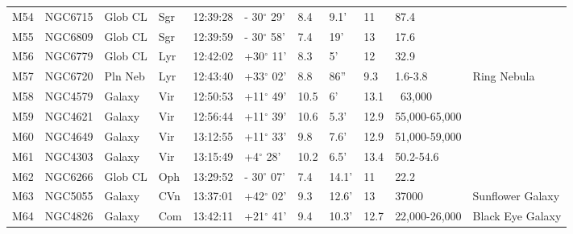\documentclass[10pt,twoside,a4paper,english]{article}
\begin{document}
\begin{longtable}{@{}lllllllllll@{}}
M54        & NGC6715     & Glob CL    & Sgr       & 12:39:28 & - 30$^{\circ}$ 29' & 8.4       & 9.1'                 & 11       & 87.4                &                                           \\ 
M55        & NGC6809     & Glob CL    & Sgr       & 12:39:59 & - 30$^{\circ}$ 58' & 7.4       & 19'                  & 13       & 17.6                &                                           \\ 
M56        & NGC6779     & Glob CL    & Lyr       & 12:42:02 & +30$^{\circ}$ 11'  & 8.3       & 5'                   & 12       & 32.9                &                                           \\ 
M57        & NGC6720     & Pln Neb    & Lyr       & 12:43:40 & +33$^{\circ}$ 02'  & 8.8       & 86''                 & 9.3      & 1.6-3.8             & Ring Nebula                               \\ 
M58        & NGC4579     & Galaxy     & Vir       & 12:50:53 & +11$^{\circ}$ 49'  & 10.5      & 6'                   & 13.1     & ~63,000             &                                           \\ 
M59        & NGC4621     & Galaxy     & Vir       & 12:56:44 & +11$^{\circ}$ 39'  & 10.6      & 5.3'                 & 12.9     & 55,000-65,000       &                                           \\ 
M60        & NGC4649     & Galaxy     & Vir       & 13:12:55 & +11$^{\circ}$ 33'  & 9.8       & 7.6'                 & 12.9     & 51,000-59,000       &                                           \\ 
M61        & NGC4303     & Galaxy     & Vir       & 13:15:49 & +4$^{\circ}$ 28'   & 10.2      & 6.5'                 & 13.4     & 50.2-54.6           &                                           \\ 
M62        & NGC6266     & Glob CL    & Oph       & 13:29:52 & - 30$^{\circ}$ 07' & 7.4       & 14.1'                & 11       & 22.2                &                                           \\ 
M63        & NGC5055     & Galaxy     & CVn       & 13:37:01 & +42$^{\circ}$ 02'  & 9.3       & 12.6'                & 13       & 37000               & Sunflower Galaxy                          \\ 
M64        & NGC4826     & Galaxy     & Com       & 13:42:11 & +21$^{\circ}$ 41'  & 9.4       & 10.3'                & 12.7     & 22,000-26,000       & Black Eye Galaxy                          \\ 

\end{longtable}
\end{document}
